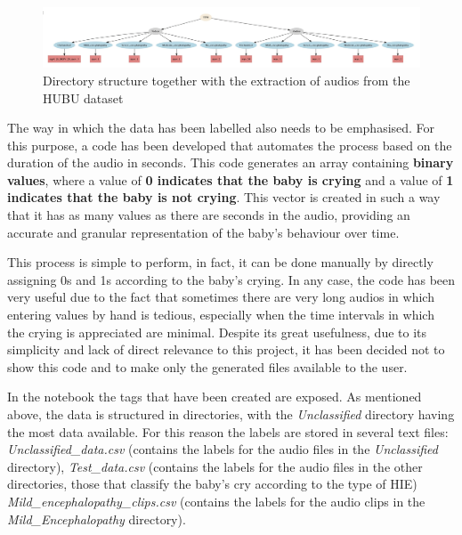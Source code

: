 \begin{figure}[h]
\centering
    \includegraphics[width=1\textwidth]{figures/directory-with-audio.png}
\caption{Directory structure together with the extraction of audios from the HUBU dataset}
\label{fig:directory-audios}
\end{figure}

The way in which the data has been labelled also needs to be emphasised. For this purpose, a code has been developed that automates the process based on the duration of the audio in seconds. This code generates an array containing \textbf{binary values}, where a value of \textbf{0 indicates that the baby is crying} and a value of \textbf{1 indicates that the baby is not crying}. This vector is created in such a way that it has as many values as there are seconds in the audio, providing an accurate and granular representation of the baby's behaviour over time.

This process is simple to perform, in fact, it can be done manually by directly assigning 0s and 1s according to the baby's crying. In any case, the code has been very useful due to the fact that sometimes there are very long audios in which entering values by hand is tedious, especially when the time intervals in which the crying is appreciated are minimal. Despite its great usefulness, due to its simplicity and lack of direct relevance to this project, it has been decided not to show this code and to make only the generated files available to the user. 

In the notebook  the tags that have been created are exposed. As mentioned above, the data is structured in directories, with the \textit{Unclassified} directory having the most data available. For this reason the labels are stored in several text files: \textit{Unclassified\_data.csv} (contains the labels for the audio files in the \textit{Unclassified} directory), \textit{Test\_data.csv} (contains the labels for the audio files in the other directories, those that classify the baby's cry according to the type of HIE) \textit{Mild\_encephalopathy\_clips.csv} (contains the labels for the audio clips in the \textit{Mild\_Encephalopathy} directory).

